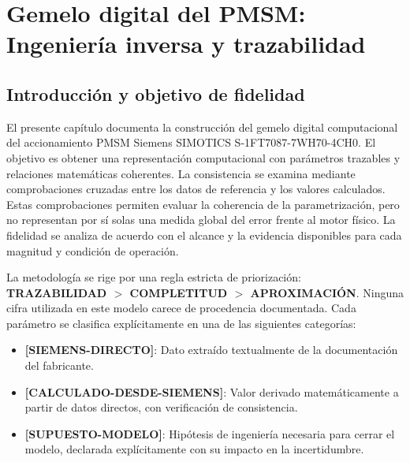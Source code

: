 \chapter{Gemelo digital del PMSM: Ingeniería inversa y trazabilidad}

\section{Introducción y objetivo de fidelidad}

El presente capítulo documenta la construcción del gemelo digital computacional del accionamiento PMSM Siemens SIMOTICS S-1FT7087-7WH70-4CH0. El objetivo es obtener una representación computacional con parámetros trazables y relaciones matemáticas coherentes. La consistencia se examina mediante comprobaciones cruzadas entre los datos de referencia y los valores calculados. Estas comprobaciones permiten evaluar la coherencia de la parametrización, pero no representan por sí solas una medida global del error frente al motor físico. La fidelidad se analiza de acuerdo con el alcance y la evidencia disponibles para cada magnitud y condición de operación.

La metodología se rige por una regla estricta de priorización: \textbf{TRAZABILIDAD $>$ COMPLETITUD $>$ APROXIMACIÓN}. Ninguna cifra utilizada en este modelo carece de procedencia documentada. Cada parámetro se clasifica explícitamente en una de las siguientes categorías:
\begin{itemize}
    \item \textbf{[SIEMENS-DIRECTO]}: Dato extraído textualmente de la documentación del fabricante.
    \item \textbf{[CALCULADO-DESDE-SIEMENS]}: Valor derivado matemáticamente a partir de datos directos, con verificación de consistencia.
    \item \textbf{[SUPUESTO-MODELO]}: Hipótesis de ingeniería necesaria para cerrar el modelo, declarada explícitamente con su impacto en la incertidumbre.
\end{itemize}


